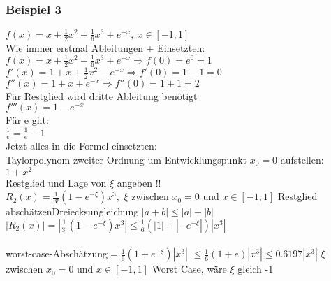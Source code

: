 \documentclass[12pt,a4paper]{article}
\renewenvironment{shaded}{%
	\def\FrameCommand{\fboxsep=\FrameSep \colorbox{shadecolor}}%
	\MakeFramed{\advance\hsize-\width \FrameRestore\FrameRestore}}%
{\endMakeFramed}
\begin{document}
\subsubsection{Beispiel 3}
$f(x)=x+\frac{1}{2}x^2+\frac{1}{6}x^3+e^{-x},\ x\in\left[-1, 1\right]$\\
Wie immer erstmal Ableitungen + Einsetzten:\\
\hspace*{1cm}$f(x)=x+\frac{1}{2}x^2+\frac{1}{6}x^3+e^{-x}\Rightarrow f(0)=e^0=1$\\
\hspace*{1cm}$f'(x)=1+x+\frac{1}{2}x^2-e^{-x}\Rightarrow f'(0)=1-1=0$\\
\hspace*{1cm}$f''(x)=1+x+e^{-x}\Rightarrow f''(0)=1+1=2$\\
Für Restglied wird dritte Ableitung benötigt\\
\hspace*{1cm}$f'''(x)=1-e^{-x}$\\
Für e gilt:\\
\hspace*{1cm}$\frac{1}{e}=\frac{1}{e}-1$\\
Jetzt alles in die Formel einsetzten:\\
Taylorpolynom zweiter Ordnung um Entwicklungspunkt $x_0=0$ aufstellen:\\
\hspace*{1cm}$1+x^2$\\
Restglied und Lage von $\xi$ angeben !!\\
$R_2(x)=\frac{1}{3!}\left(1-e^{-\xi}\right)x^3,$
\begin{shaded}
	$\xi$ zwischen $x_0=0$ und $x\in\left[-1,1\right]$
\end{shaded}
Restglied abschätzen\hspace*{1cm}Dreiecksungleichung $\left|a+b\right|\leq\left|a\right|+\left|b\right|$\\
$\left|R_2(x)\right|=\left|\frac{1}{3!}\left(1-e^{-\xi}\right)x^3\right|\leq\frac{1}{6}\left(\left|1\right|+\left|-e^{-\xi}\right|\right)\left|x^3\right|$\\
\\
worst-case-Abschätzung\hspace*{1cm}$=\frac{1}{6}\left(1+e^{-\xi}\right)\left|x^3\right|$
\begin{shaded}
	$\leq\frac{1}{6}\left(1+e\right)\left|x^3\right|\leq 0.6197\left|x^3\right|$
\end{shaded}
\begin{shaded}
	$\xi$ zwischen $x_0=0$ und $x\in\left[-1,1\right]$
\end{shaded}
Worst Case, wäre $\xi$ gleich -1\\
\end{document}

